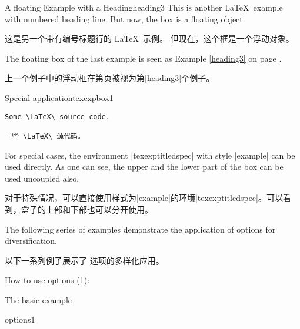 \begin{dispListing}
\begin{texexptitled}[float]{A floating Example with a Heading}{heading3}
This is another \LaTeX\ example with numbered heading line.
But now, the box is a floating object.

这是另一个带有编号标题行的 \LaTeX\ 示例。 但现在，这个框是一个浮动对象。
\end{texexptitled}
\end{dispListing}
\tcbusetemp

\begin{dispExample}
The floating box of the last example is seen as Example \ref{heading3}
on page \pageref{heading3}.

上一个例子中的浮动框在第\pageref{heading3}页被视为第\ref{heading3}个例子。
\end{dispExample}


\begin{dispExample}
\begin{texexptitledspec}{Special application}{texexpbox1}
\begin{lstlisting}[style=tcblatex]
Some \LaTeX\ source code.

一些 \LaTeX\ 源代码。
\end{lstlisting}
\tcblower
For special cases, the environment |texexptitledspec| with style
|example| can be used directly. As one can see, the upper and the lower
part of the box can be used uncoupled also.

对于特殊情况，可以直接使用样式为|example|的环境|texexptitledspec|。可以看到，盒子的上部和下部也可以分开使用。
\end{texexptitledspec}
\end{dispExample}


The following series of examples demonstrate the application of
 options for diversification.

以下一系列例子展示了  选项的多样化应用。
\begin{dispExample}
\begin{texexptitled}{How to use options (1):\par The basic example}{options1}
\end{texexptitled}
\end{dispExample}


